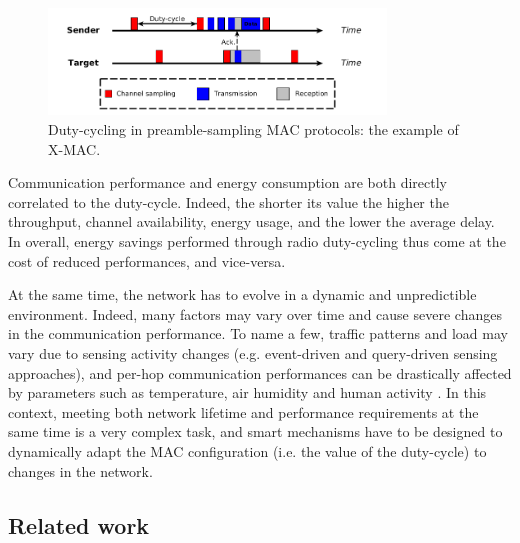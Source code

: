 \documentclass[12pt,journal,compsoc]{IEEEtran}
\begin{document}
\begin{figure}
	\begin{centering}
	\includegraphics[width=0.8\textwidth]{figs/DC.png}
	\caption{Duty-cycling in preamble-sampling MAC protocols: the example of X-MAC.}
	\label{RW_dutycycle}
	\end{centering}
\end{figure}

Communication performance and energy consumption are both directly correlated to the duty-cycle. Indeed, the shorter its value the higher the throughput, channel availability, energy usage, and the lower the average delay. In overall, energy savings performed through radio duty-cycling thus come at the cost of reduced performances, and vice-versa.

At the same time, the network has to evolve in a dynamic and unpredictible environment. Indeed, many  factors may vary over time and cause severe changes in the communication performance. To name a few, traffic patterns and load may vary due to sensing activity changes (e.g. event-driven and query-driven sensing approaches), and per-hop communication performances can be drastically affected by parameters such as temperature, air humidity and human activity \cite{linkstability12, addvalue13, tempimpact10}.
In this context, meeting both network lifetime and performance requirements at the same time is a very complex task, and smart mechanisms have to be designed to dynamically adapt the MAC configuration (i.e. the value of the duty-cycle) to changes in the network.%

\subsection{Related work}

\end{document}
